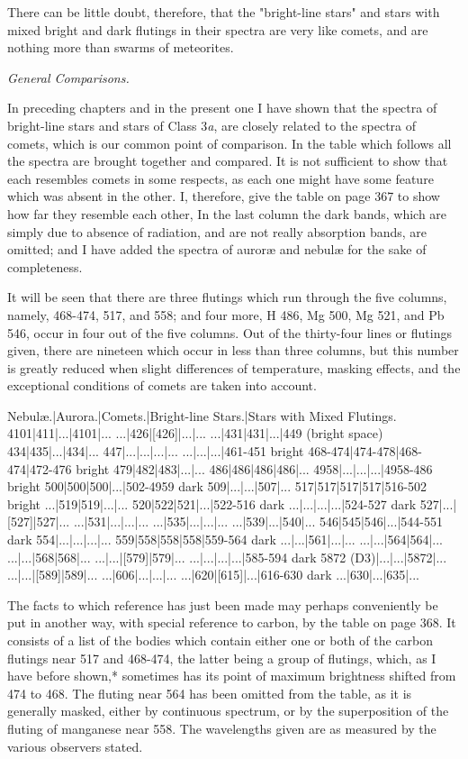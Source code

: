 \documentclass[a4paper, 12pt, oneside, polutonikogreek, english]{article}
\begin{document}
There can be little doubt, therefore, that the "bright-line stars" and stars with mixed bright and dark flutings in their spectra are very like comets, and are nothing more than swarms of meteorites.

\emph{General Comparisons.}

In preceding chapters and in the present one I have shown that the spectra of bright-line stars and stars of Class 3\emph{a}, are closely related to the spectra of comets, which is our common point of comparison. In the table which follows all the spectra are brought together and compared. It is not sufficient to show that each resembles comets in some respects, as each one might have some feature which was absent in the other. I, therefore, give the table on page 367 to show how far they resemble each other, In the last column the dark bands, which are simply due to absence of radiation, and are not really absorption bands, are omitted; and I have added the spectra of auroræ and nebulæ for the sake of completeness.

It will be seen that there are three flutings which run through the five columns, namely, 468-474, 517, and 558; and four more, H 486, Mg 500, Mg 521, and Pb 546, occur in four out of the five columns. Out of the thirty-four lines or flutings given, there are nineteen which occur in less than three columns, but this number is greatly reduced when slight differences of temperature, masking effects, and the exceptional conditions of comets are taken into account.

Nebulæ.|Aurora.|Comets.|Bright-line Stars.|Stars with Mixed Flutings. 
4101|411|...|4101|... 
...|426|[426]|...|... 
...|431|431|...|449 (bright space) 
434|435|...|434|... 
447|...|...|...|... 
...|...|...|461-451 bright 
468-474|474-478|468-474|472-476 bright 
479|482|483|...|... 
486|486|486|486|... 
4958|...|...|...|4958-486 bright 
500|500|500|...|502-4959 dark 
509|...|...|507|... 
517|517|517|517|516-502 bright 
...|519|519|...|... 
520|522|521|...|522-516 dark 
...|...|...|...|524-527 dark 
527|...|[527]|527|... 
...|531|...|...|... 
...|535|...|...|... 
...|539|...|540|... 
546|545|546|...|544-551 dark 
554|...|...|...|... 
559|558|558|558|559-564 dark 
...|...|561|...|... 
...|...|564|564|... 
...|...|568|568|... 
...|...|[579]|579|... 
...|...|...|...|585-594 dark 
5872 (D3)|...|...|5872|... 
...|...|[589]|589|... 
...|606|...|...|... 
...|620|[615]|...|616-630 dark 
...|630|...|635|... 

The facts to which reference has just been made may perhaps conveniently be put in another way, with special reference to carbon, by the table on page 368. It consists of a list of the bodies which contain either one or both of the carbon flutings near 517 and 468-474, the latter being a group of flutings, which, as I have before shown,* sometimes has its point of maximum brightness shifted from 474 to 468. The fluting near 564 has been omitted from the table, as it is generally masked, either by continuous spectrum, or by the superposition of the fluting of manganese near 558. The wavelengths given are as measured by the various observers stated.
\end{document}
